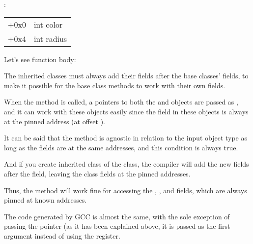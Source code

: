 :

\begin{center}
\begin{tabular}{ | l | l | }
\hline
  \tableheader{} \\
\hline
  +0x0 & int color \\
\hline
  +0x4 & int radius \\
\hline
\end{tabular}
\end{center}

Let's see \main function body:




The inherited classes must always add their fields after the base classes' fields, to make it possible for the base 
class methods to work with their own fields.


When the  method is called, a pointers to both the  and  objects are passed as ,
and it can work with these objects easily since the  field in these objects is always at the pinned address (at offset ).


It can be said that the  method is agnostic in relation to the input object type as long as the fields are 
at the same addresses, and this condition is always true.


And if you create inherited class of the  class, 
the compiler will add the new fields after the  field,
leaving the  class fields at the pinned addresses.


Thus, the  method will work fine for accessing the 
, ,  and  fields, which are always pinned at known addresses.


The code generated by GCC is almost the same, with the sole exception of passing the  pointer (as it has been explained above,
it is passed as the first argument instead of using the \ECX register.

